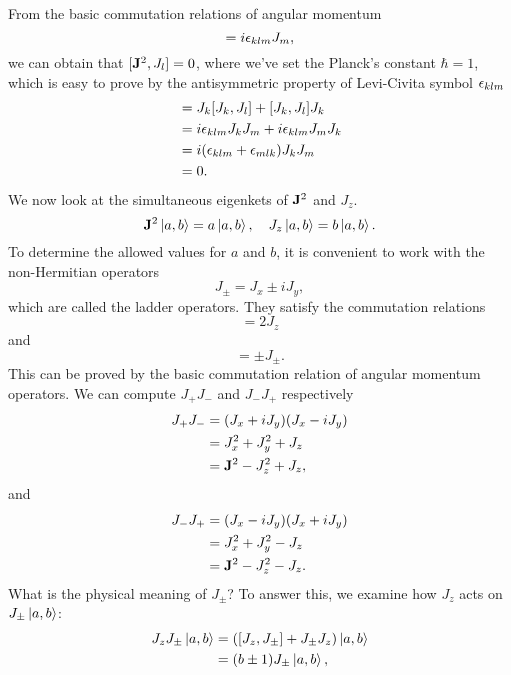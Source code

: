 \documentclass[10pt]{article}
\begin{document}
	From the basic commutation relations of angular momentum
	\begin{equation}
		[J_k, J_l] = i \eps_{klm} J_m,
	\end{equation}
	we can obtain that $[{\bf J}^2, J_l] = 0$, where we've set the Planck's constant $\hbar = 1$, which is easy to prove by the antisymmetric property of Levi-Civita symbol $\epsilon_{klm}$
	\begin{align*}
		[\bfJ^2, J_l] &= J_k [J_k, J_l] + [J_k, J_l] J_k \\
		&= i \eps_{klm} J_k J_m + i \eps_{klm} J_m J_k \\
		&= i (\eps_{klm} + \eps_{mlk}) J_k J_m \\
		&= 0.
	\end{align*}
	We now look at the simultaneous eigenkets of ${\bf J}^2$ and $J_z$.
	\begin{equation}
		{\bf J}^2 \ket{a,b} = a \ket{a,b}, \quad J_z \ket{a,b} = b \ket{a,b}.
	\end{equation}
	To determine the allowed values for $a$ and $b$, it is convenient to work with the non-Hermitian operators
	\begin{equation}
		J_{\pm} = J_x \pm i J_y,
	\end{equation}
	which are called the ladder operators. They satisfy the commutation relations
	\begin{equation}
		[J_+, J_-] = 2 J_z
	\end{equation}
	and
	\begin{equation}
		[J_z, J_{\pm}] = \pm J_{\pm}.
	\end{equation}
	This can be proved by the basic commutation relation of angular momentum operators. We can compute $J_+ J_-$ and $J_- J_+$ respectively
	\begin{align*}
		J_{+} J_{-} &= (J_x + i J_y) (J_x - i J_y) \\
		&= J_x^2 + J_y^2  + J_z \\
		&= {\bf J}^2 - J_z^2 + J_z,
	\end{align*}
	and
	\begin{align*}
		J_{-} J_{+} &= (J_x - i J_y) (J_x + i J_y) \\
		&= J_x^2 + J_y^2  - J_z \\
		&= {\bf J}^2 - J_z^2 - J_z.
	\end{align*}
	What is the physical meaning of $J_{\pm}$? To answer this, we examine how $J_z$ acts on $J_{\pm} \ket{a,b}$:
	\begin{align*}
		J_z J_{\pm} \ket{a,b} &= ([J_z, J_{\pm}] + J_{\pm} J_z) \ket{a,b} \\
		&= (b \pm 1) J_{\pm} \ket{a,b},
	\end{align*}
\end{document}
